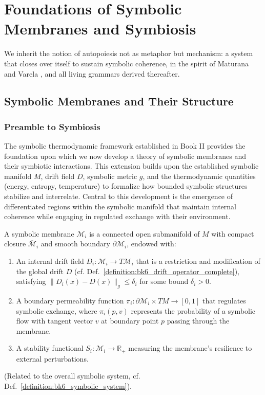 \section{Foundations of Symbolic Membranes and Symbiosis} \label{sec:bk3_foundations_symbolic_membranes_symbiosis}
We inherit the notion of autopoiesis not as metaphor but mechanism: a system that closes over itself to sustain symbolic coherence, in the spirit of Maturana and Varela \cite{maturana1980autopoiesis}, and all living grammars derived thereafter.

\subsection{Symbolic Membranes and Their Structure} \label{subsec:bk3_symbolic_membranes_structure}
\subsubsection*{Preamble to Symbiosis}
\label{subsec:bk3_preamble_to_symbiosis}
The symbolic thermodynamic framework established in Book II provides the foundation upon which we now develop a theory of symbolic membranes and their symbiotic interactions. This extension builds upon the established symbolic manifold $M$, drift field $D$, symbolic metric $g$, and the thermodynamic quantities (energy, entropy, temperature) to formalize how bounded symbolic structures stabilize and interrelate. Central to this development is the emergence of differentiated regions within the symbolic manifold that maintain internal coherence while engaging in regulated exchange with their environment.

\begin{definition} \label{definition:bk3__begindefinitionsymbolic_membrane}
A symbolic membrane $\mathcal{M}_i$ is a connected open submanifold of $M$ with compact closure $\overline{\mathcal{M}}_i$ and smooth boundary $\partial\mathcal{M}_i$, endowed with:
\begin{enumerate}
    \item An internal drift field $D_i: \mathcal{M}_i \rightarrow T\mathcal{M}_i$ that is a restriction and modification of the global drift $D$ (cf. Def.~\ref{definition:bk6_drift_operator_complete}), satisfying $\|D_i(x) - D(x)\|_g \leq \delta_i$ for some bound $\delta_i > 0$.
    \item A boundary permeability function $\pi_i: \partial\mathcal{M}_i \times TM \rightarrow [0,1]$ that regulates symbolic exchange, where $\pi_i(p,v)$ represents the probability of a symbolic flow with tangent vector $v$ at boundary point $p$ passing through the membrane.
    \item A stability functional $S_i: \mathcal{M}_i \rightarrow \mathbb{R}_+$ measuring the membrane's resilience to external perturbations.
\end{enumerate}
(Related to the overall symbolic system, cf. Def.~\ref{definition:bk6_symbolic_system}).
\end{definition}

